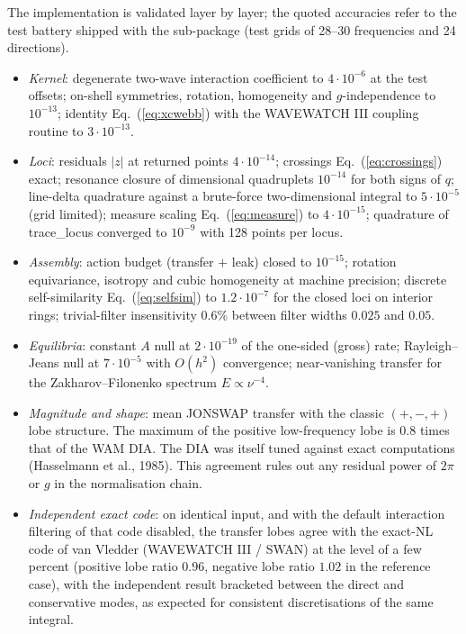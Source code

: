 \documentclass[12pt]{article}
\newcommand{\eq }  [1]{Eq.~(\ref{#1})}  %
\begin{document}
The implementation is validated layer by layer; the quoted accuracies refer
to the test battery shipped with the sub-package (test grids of 28--30
frequencies and 24 directions).

\begin{itemize}
\item \emph{Kernel}: degenerate two-wave interaction coefficient to $4\cdot
10^{-6}$ at the test offsets; on-shell symmetries, rotation, homogeneity and $g$-independence to
$10^{-13}$; identity \eq{eq:xcwebb} with the WAVEWATCH III coupling routine
to $3\cdot 10^{-13}$.
\item \emph{Loci}: residuals $|z|$ at returned points $4 \cdot 10^{-14}$;
crossings \eq{eq:crossings} exact; resonance closure of dimensional
quadruplets $10^{-14}$ for both signs of $q$; line-delta quadrature against a
brute-force two-dimensional integral to $5\cdot 10^{-5}$ (grid limited);
measure scaling \eq{eq:measure} to $4 \cdot 10^{-15}$; quadrature of
trace\_locus converged to $10^{-9}$ with 128 points per locus.
\item \emph{Assembly}: action budget (transfer $+$ leak) closed to
$10^{-15}$; rotation equivariance, isotropy and cubic homogeneity at
machine precision; discrete self-similarity \eq{eq:selfsim} to
$1.2 \cdot 10^{-7}$ for the closed loci on interior rings;
trivial-filter insensitivity $0.6\%$ between filter widths $0.025$ and
$0.05$.
\item \emph{Equilibria}: constant $A$ null at $2\cdot 10^{-19}$ of the
one-sided (gross) rate; Rayleigh--Jeans null at $7\cdot 10^{-5}$ with $O(h^2)$
convergence; near-vanishing transfer for the Zakharov--Filonenko spectrum
$E \propto \nu^{-4}$.
\item \emph{Magnitude and shape}: mean JONSWAP transfer with the classic
$(+,-,+)$ lobe structure.
The maximum of the positive low-frequency lobe is
$0.8$ times that of the WAM DIA.
The DIA was itself tuned against exact computations
(Hasselmann et al., 1985).
This agreement rules out any residual power of $2\pi$ or $g$ in the
normalisation chain.
\item \emph{Independent exact code}: on identical input, and with the
default interaction filtering of that code disabled, the transfer lobes agree
with the exact-NL code of van Vledder (WAVEWATCH III / SWAN) at the level of
a few percent (positive lobe ratio $0.96$, negative lobe ratio $1.02$ in the
reference case), with the independent result bracketed between the direct and
conservative modes, as expected for consistent discretisations of the same
integral.
\end{itemize}
\end{document}
